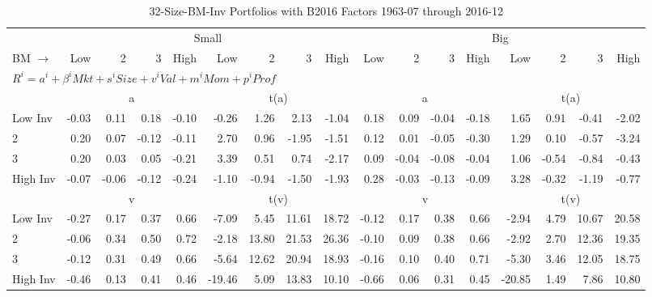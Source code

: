 
\begin{table}[!ht]
\centering
\caption{32-Size-BM-Inv Portfolios with B2016 Factors 1963-07 through 2016-12}
\begin{tabular}{lrrrrrrrrrrrrrrrr}
  \toprule
    & \multicolumn{8}{c}{Small} & \multicolumn{8}{c}{Big} \\
      \cmidrule(r){2-9} \cmidrule(r){10-17}
    BM $\rightarrow$ & Low & 2 & 3 & High & Low & 2 & 3 & High & Low & 2 & 3 & High & Low & 2 & 3 & High \\ 
  \midrule
  \multicolumn{17}{l}{$R^i=a^i+\beta^iMkt+s^iSize+v^iVal+m^iMom+p^iProf$} \\

  
    
      & \multicolumn{4}{c}{a} & \multicolumn{4}{c}{t(a)}
    
      & \multicolumn{4}{c}{a} & \multicolumn{4}{c}{t(a)}
    
    \\
      \cmidrule(r){2-5} \cmidrule(r){6-9} \cmidrule(r){10-13} \cmidrule(r){14-17}

    Low Inv   & -0.03  & 0.11  & 0.18  & -0.10  & -0.26  & 1.26  & 2.13  & -1.04  & 0.18  & 0.09  & -0.04  & -0.18  & 1.65  & 0.91  & -0.41  & -2.02  \\
           2  & 0.20  & 0.07  & -0.12  & -0.11  & 2.70  & 0.96  & -1.95  & -1.51  & 0.12  & 0.01  & -0.05  & -0.30  & 1.29  & 0.10  & -0.57  & -3.24  \\
           3  & 0.20  & 0.03  & 0.05  & -0.21  & 3.39  & 0.51  & 0.74  & -2.17  & 0.09  & -0.04  & -0.08  & -0.04  & 1.06  & -0.54  & -0.84  & -0.43  \\
    High Inv  & -0.07  & -0.06  & -0.12  & -0.24  & -1.10  & -0.94  & -1.50  & -1.93  & 0.28  & -0.03  & -0.13  & -0.09  & 3.28  & -0.32  & -1.19  & -0.77  \\

  
    
      & \multicolumn{4}{c}{v} & \multicolumn{4}{c}{t(v)}
    
      & \multicolumn{4}{c}{v} & \multicolumn{4}{c}{t(v)}
    
    \\
      \cmidrule(r){2-5} \cmidrule(r){6-9} \cmidrule(r){10-13} \cmidrule(r){14-17}

    Low Inv   & -0.27  & 0.17  & 0.37  & 0.66  & -7.09  & 5.45  & 11.61  & 18.72  & -0.12  & 0.17  & 0.38  & 0.66  & -2.94  & 4.79  & 10.67  & 20.58  \\
           2  & -0.06  & 0.34  & 0.50  & 0.72  & -2.18  & 13.80  & 21.53  & 26.36  & -0.10  & 0.09  & 0.38  & 0.66  & -2.92  & 2.70  & 12.36  & 19.35  \\
           3  & -0.12  & 0.31  & 0.49  & 0.66  & -5.64  & 12.62  & 20.94  & 18.93  & -0.16  & 0.10  & 0.40  & 0.71  & -5.30  & 3.46  & 12.05  & 18.75  \\
    High Inv  & -0.46  & 0.13  & 0.41  & 0.46  & -19.46  & 5.09  & 13.83  & 10.10  & -0.66  & 0.06  & 0.31  & 0.45  & -20.85  & 1.49  & 7.86  & 10.80  \\


\end{tabular}
\end{table}
